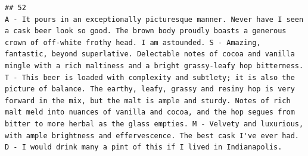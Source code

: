 \documentclass[
  a4paper,
]{article}
\begin{document}
\begin{verbatim}
## 52                                                                                                                                                                                                                                                                                                                                                                                                                                                                                                                                                                                                                                                                                                                                                                                                                                                                                                                        A - It pours in an exceptionally picturesque manner. Never have I seen a cask beer look so good. The brown body proudly boasts a generous crown of off-white frothy head. I am astounded. S - Amazing, fantastic, beyond superlative. Delectable notes of cocoa and vanilla mingle with a rich maltiness and a bright grassy-leafy hop bitterness. T - This beer is loaded with complexity and subtlety; it is also the picture of balance. The earthy, leafy, grassy and resiny hop is very forward in the mix, but the malt is ample and sturdy. Notes of rich malt meld into nuances of vanilla and cocoa, and the hop segues from bitter to more herbal as the glass empties. M - Velvety and luxurious, with ample brightness and effervescence. The best cask I've ever had. D - I would drink many a pint of this if I lived in Indianapolis.

\end{verbatim}
\end{document}
